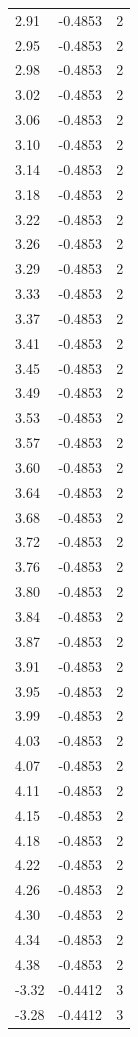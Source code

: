 \begin{longtable}{lrr}
  2.91 & -0.4853 & 2 \\
  2.95 & -0.4853 & 2 \\
  2.98 & -0.4853 & 2 \\
  3.02 & -0.4853 & 2 \\
  3.06 & -0.4853 & 2 \\
  3.10 & -0.4853 & 2 \\
  3.14 & -0.4853 & 2 \\
  3.18 & -0.4853 & 2 \\
  3.22 & -0.4853 & 2 \\
  3.26 & -0.4853 & 2 \\
  3.29 & -0.4853 & 2 \\
  3.33 & -0.4853 & 2 \\
  3.37 & -0.4853 & 2 \\
  3.41 & -0.4853 & 2 \\
  3.45 & -0.4853 & 2 \\
  3.49 & -0.4853 & 2 \\
  3.53 & -0.4853 & 2 \\
  3.57 & -0.4853 & 2 \\
  3.60 & -0.4853 & 2 \\
  3.64 & -0.4853 & 2 \\
  3.68 & -0.4853 & 2 \\
  3.72 & -0.4853 & 2 \\
  3.76 & -0.4853 & 2 \\
  3.80 & -0.4853 & 2 \\
  3.84 & -0.4853 & 2 \\
  3.87 & -0.4853 & 2 \\
  3.91 & -0.4853 & 2 \\
  3.95 & -0.4853 & 2 \\
  3.99 & -0.4853 & 2 \\
  4.03 & -0.4853 & 2 \\
  4.07 & -0.4853 & 2 \\
  4.11 & -0.4853 & 2 \\
  4.15 & -0.4853 & 2 \\
  4.18 & -0.4853 & 2 \\
  4.22 & -0.4853 & 2 \\
  4.26 & -0.4853 & 2 \\
  4.30 & -0.4853 & 2 \\
  4.34 & -0.4853 & 2 \\
  4.38 & -0.4853 & 2 \\
  -3.32 & -0.4412 & 3 \\
  -3.28 & -0.4412 & 3 \\

\end{longtable}
